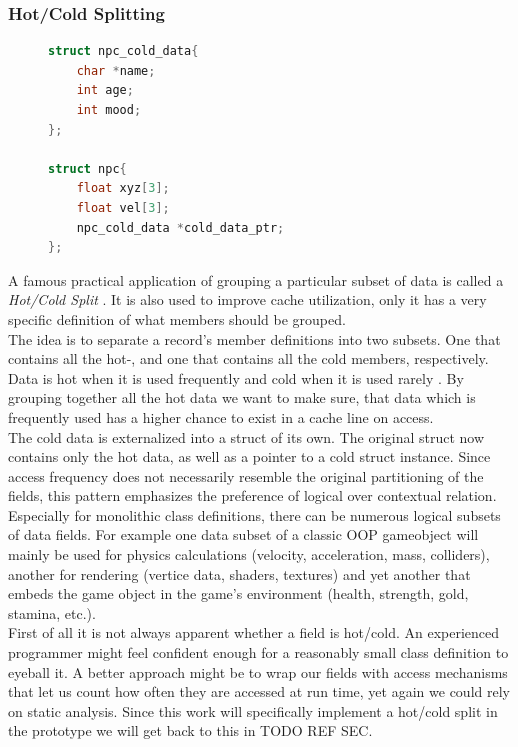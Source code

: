 \subsubsection{Hot/Cold Splitting}\label{hot_cold_splitting}
\begin{figure}
\begin{lstlisting}[language=C++,numbers=none,name={The NPC class splitted into hot/cold data},label={hcsplit_npc}]
struct npc_cold_data{
	char *name;
	int age;
	int mood;
};

struct npc{
	float xyz[3];
	float vel[3];
	npc_cold_data *cold_data_ptr;
};
\end{lstlisting}
\end{figure}
A famous practical application of grouping a particular subset of data is called a \textit{Hot/Cold Split} . It is also used to improve cache utilization, only it has a very specific definition of what members should be grouped.\\
The idea is to separate a record's member definitions into two subsets. One that contains all the hot-, and one that contains all the cold members, respectively. Data is hot when it is used frequently and cold when it is used rarely . By grouping together all the hot data we want to make sure, that data which is frequently used has a higher chance to exist in a cache line on access.\\
The cold data is externalized into a struct of its own. The original struct now contains only the hot data, as well as a pointer to a cold struct instance. Since access frequency does not necessarily resemble the original partitioning of the fields, this pattern emphasizes the preference of logical over contextual relation.\\
Especially for monolithic class definitions, there can be numerous logical subsets of data fields. For example one data subset of a classic OOP gameobject will mainly be used for physics calculations (velocity, acceleration, mass, colliders), another for rendering (vertice data, shaders, textures) and yet another that embeds the game object in the game's environment (health, strength, gold, stamina, etc.).\\
First of all it is not always apparent whether a field is hot/cold. An experienced programmer might feel confident enough for a reasonably small class definition to eyeball it. A better approach might be to wrap our fields with access mechanisms that let us count how often they are accessed at run time, yet again we could rely on static analysis. Since this work will specifically implement a hot/cold split in the prototype we will get back to this in TODO REF SEC.\\
